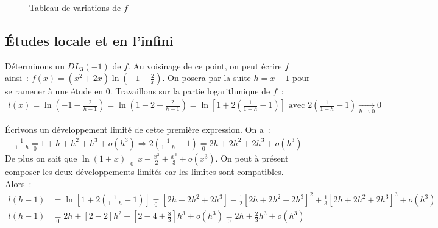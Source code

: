 \documentclass{article}
\newcommand{\oo}[1]{+ o\!\left(#1\right)}
\begin{document}
  \begin{figure}[ht]
    \begin{center}
      \caption{Tableau de variations de $f$}
      \label{varf}
    \end{center}
  \end{figure}

  \subsection*{Études locale et en l'infini}
  Déterminons un $DL_3(-1)$ de $f$. Au voisinage de ce point, on peut écrire $f$ ainsi~: $f(x) = (x^2 + 2x)\ln(-1 - \frac{2}{x})$. On posera par la suite $h = x + 1$ pour se ramener à une étude en 0. Travaillons sur la partie logarithmique de $f$~:
  \begin{align*}
    l(x) = \ln\left(-1 - \frac{2}{h - 1}\right) = \ln\left(1 - 2 - \frac{2}{h - 1}\right) = \ln\left[1 + 2\left(\frac{1}{1 - h} - 1\right)\right] \text{ avec } 2\left(\frac{1}{1 - h} - 1\right) \underset{h\to 0}{\longrightarrow} 0
  \end{align*}

  Écrivons un développement limité de cette première expression. On a~:
  \begin{align*}
    \frac{1}{1 - h} \underset{0}{=} 1 + h + h^2 + h^3 \oo{h^3} \Longrightarrow
    2\left(\frac{1}{1 - h} - 1\right) \underset{0}{=} 2h + 2h^2 + 2h^3 \oo{h^3}
  \end{align*}
  De plus on sait que $\ln(1 + x) \underset{0}{=} x - \frac{x^2}{2} + \frac{x^3}{3} \oo{x^3}$. On peut à présent composer les deux développements limités car les limites sont compatibles. Alors~:
  \begin{align*}
    l(h - 1) &= \ln\left[1 + 2\left(\frac{1}{1 - h} - 1\right)\right] \underset{0}{=} \left[2h + 2h^2 + 2h^3\right] - \frac{1}{2}\left[2h + 2h^2 + 2h^3\right]^2 + \frac{1}{3}\left[2h + 2h^2 + 2h^3\right]^3 \oo{h^3} \\
    l(h - 1) & \underset{0}{=} 2h + [2 - 2]h^2 + \left[2 - 4 + \frac{8}{3}\right]h^3 \oo{h^3} \underset{0}{=} 2h + \frac{2}{3}h^3 \oo{h^3}
  \end{align*}
\end{document}
